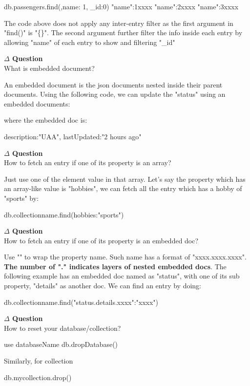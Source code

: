 \documentclass[12pt]{article}
\newenvironment{que}
    { \begin{mdframed}[backgroundcolor=green!20] \textbf{$\Delta$ Question} \\}
    {  \end{mdframed}}
\begin{document}
\begin{code}
db.passengers.find({},{name: 1, _id:0})
{"name":1xxxx}
{"name":2xxxx}
{"name":3xxxx}
\end{code}
The code above does not apply any inter-entry filter as the first argument in "find()" is "\{\}". The second argument further filter the info inside each entry by allowing "name" of each entry to show and filtering "\_id"
\begin{que}
What is embedded document?
\end{que}
An embedded document is the json documents nested inside their parent documents. Using the following code, we can update the "status" using an embedded documents:
where the embedded doc is:
\begin{code}
{description:"UAA", lastUpdated:"2 hours ago"}
\end{code}

\begin{que}
How to fetch an entry if one of its property is an array?
\end{que}
Just use one of the element value in that array. Let's say the property which has an array-like value is "hobbies", we can fetch all the entry which has a hobby of "sports" by:
\begin{code}
db.collectionname.find({hobbies:"sports"})
\end{code}
\begin{que}
How to fetch an entry if one of its property is an embedded doc?
\end{que}
Use "" to wrap the property name. Such name has a format of "xxxx.xxxx.xxxx". \textbf{The number of "." indicates layers of nested embedded docs}. The following example has an embedded doc named as "status", with one of its sub property, "details" as another doc. We can find an entry by doing:
\begin{code}
db.collectionname.find({"status.details.xxxx":"xxxx"})
\end{code}
\begin{que}
How to reset your database/collection?
\end{que}
\begin{code}
use databaseName
db.dropDatabase()
\end{code}
Similarly, for collection
\begin{code}
db.mycollection.drop()
\end{code}
\end{document}
